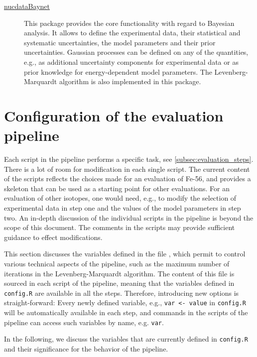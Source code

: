\documentclass[12pt,a4paper]{scrartcl}
\begin{document}
\begin{description}
  \item[\href{https://github.com/gschnabel/nucdataBaynet}{nucdataBaynet}]
  This package provides the core functionality with regard to Bayesian analysis.
  It allows to define the experimental data, their statistical and systematic uncertainties, the model parameters and their prior uncertainties.
  Gaussian processes can be defined on any of the quantities, e.g., as additional uncertainty components for experimental data or as prior knowledge for energy-dependent model parameters.
  The Levenberg-Marquardt algorithm is also implemented in this package.
   
  \end{description}
 
  
 
   
 \section{Configuration of the evaluation pipeline}
 \label{sec:config_pipeline}
 Each script in the pipeline performs a specific task, see \cref{subsec:evaluation_steps}.
 There is a lot of room for modification in each single script.
 The current content of the scripts reflects the choices made for an evaluation of Fe-56, and provides a skeleton that can be used as a starting point for other evaluations.
 For an evaluation of other isotopes, one would need, e.g., to modify the selection of experimental data in step one and the values of the model parameters in step two.
 An in-depth discussion of the individual scripts in the pipeline is beyond the scope of this document.
 The comments in the scripts may provide sufficient guidance to effect modifications.
 
 This section discusses the variables defined in the file , which permit to control various technical aspects of the pipeline, such as the maximum number of iterations in the Levenberg-Marquardt algorithm.
 The content of this file is sourced in each script of the pipeline, meaning that the variables defined in \verb#config.R# are available in all the steps.
 Therefore, introducing new options is straight-forward: Every newly defined variable, e.g., \verb#var <- value# in \verb#config.R# will be automatically available in each step, and commands in the scripts of the pipeline can access such variables by name, e.g. \verb#var#.
 
 In the following, we discuss the variables that are currently defined in \verb#config.R# and their significance for the behavior of the pipeline.
 
\end{document}
